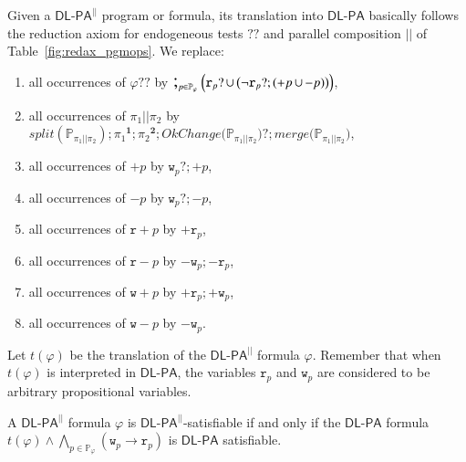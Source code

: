 \documentclass{llncs}
\newcommand{\cp}[2]{{#2}^\mathbf{#1}}
\newcommand{\pll}{ {||} }							%
\newcommand{\readOf}[1]{\mathbb{R}_{#1}}
\newcommand{\readable}[1]{\mathtt{r}_{#1}}
\newcommand{\readset}{\mathsf{Rd}}
\newcommand{\valuset}{\mathsf{V}}
\newcommand{\writable}[1]{\mathtt{w}_{#1}}
\newcommand{\writeset}{\mathsf{Wr}}
\newcommand{\testendo}{?\!\!?}			%
\newcommand{\testpdl}{?}				%
\newcommand{\writeOf}[1]{\mathbb{W}_{#1}}
\newcommand{\Dlpa}{\ensuremath{\mathsf{DL\text{-}PA}}\xspace}
\newcommand{\DlpaPll}{\ensuremath{\mathsf{DL\text{-}PA}^\pll}\xspace}
\newcommand{\assgntop}[1]{{\mathtt {+} #1}}
\newcommand{\assgnbot}[1]{{\mathtt {-} #1}}
\newcommand{\assgntopR}[1]{{\mathtt r {+} #1}}
\newcommand{\assgnbotR}[1]{{\mathtt r {-} #1}}
\newcommand{\assgntopW}[1]{{\mathtt w {+} #1}}
\newcommand{\assgnbotW}[1]{{\mathtt w {-} #1}}
\newcommand{\assgntopV}[1]{{\mathtt {+} #1}}
\newcommand{\assgnbotV}[1]{{\mathtt {-} #1}}
\newcommand{\intPgm}[1]{\llbracket #1 \rrbracket}
\newcommand{\limp}{ \rightarrow }
\newcommand{\ndet}{\,{\cup}\,}
\renewcommand{\phi}{\varphi}
\newcommand{\propset}{\mathbb P}
\newcommand{\propsetOf}[1]{\propset_{#1}}
\newcommand{\seqseq}[1]{ \text{\Large ;}_{#1} ~ }
\newcommand{\tuple}[1]{ \langle #1 \rangle}
\begin{document}
Given a \DlpaPll program or formula, its translation into \Dlpa basically follows the reduction axiom for endogeneous tests $\testendo$ and parallel composition $ \pll $ of Table~\ref{fig:redax_pgmops}. 
We replace:
\begin{enumerate}
\item
all occurrences of $\phi \testendo $ by 
$\seqseq{p \in \propsetOf \phi} \Big(
\readable{p} \testpdl \ndet \big( \lnot \readable{p} \testpdl ; (\assgntopV{p} \ndet \assgnbotV{p}) \big) 
\Big) $,
\item
all occurrences of $ \pi_1 \pll \pi_2 $ by
$\mathit{split}( \propsetOf{\pi_1 \pll \pi_2} ) ; 
\cp 1 {\pi_1} ; \cp 2 {\pi_2} ; 
\mathit{OkChange} \big(\propsetOf{\pi_1 \pll \pi_2} \big) \testpdl ;
\mathit{merge} \big(\propsetOf{\pi_1 \pll \pi_2} \big) $,
\item
all occurrences of $\assgntopV p$ by $\writable p ? ; \assgntopV p$,
\item
all occurrences of $\assgnbotV p$ by $\writable p ? ; \assgnbotV p$,
\item
all occurrences of $\assgntopR{p}$ by $\assgntop{ \readable{p}}$,
\item
all occurrences of $\assgnbotR{p}$ by $\assgnbot{ \writable{p}} ; \assgnbot{ \readable{p}}$,
\item
all occurrences of $\assgntopW{p}$ by $\assgntop{ \readable{p}} ; \assgntop{ \writable{p}}$,
\item
all occurrences of $\assgnbotW{p}$ by $\assgnbot{ \writable{p}}$.
\end{enumerate}
Let %
$t(\phi)$ be the translation of the \DlpaPll formula $\phi$.
Remember that when $t(\phi)$ is interpreted in \Dlpa, the variables $\readable p$ and $\writable{p}$ 
are considered to be arbitrary propositional variables. 

\begin{theorem}
A \DlpaPll formula $\phi$ is \DlpaPll-satisfiable if and only if the \Dlpa formula
$t(\phi) \land \bigwedge_{p \in \propsetOf \phi } (\writable{p} \limp \readable p)$ 
is \Dlpa satisfiable.
\end{theorem}
\end{document}
